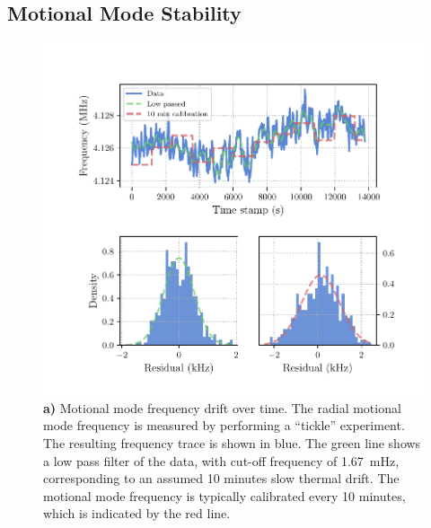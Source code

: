 
\subsection{Motional Mode Stability}
\label{sec:Motional Mode Stability}

    \begin{figure}
        \begin{center}
        \noindent\includegraphics[width=\linewidth]{
            figures/pdf_figure/mode_drift.pdf
            }
        \end{center}
        \caption{
            \textbf{a)} Motional mode frequency drift over time. The radial motional mode frequency is measured by performing a ``tickle'' experiment. The resulting frequency trace is shown in blue. The green line shows a low pass filter of the data, with cut-off frequency of 1.67~\unit{\mHz}, corresponding to an assumed 10 minutes slow thermal drift. The motional mode frequency is typically calibrated every 10 minutes, which is indicated by the red line. 
}
\end{figure}
